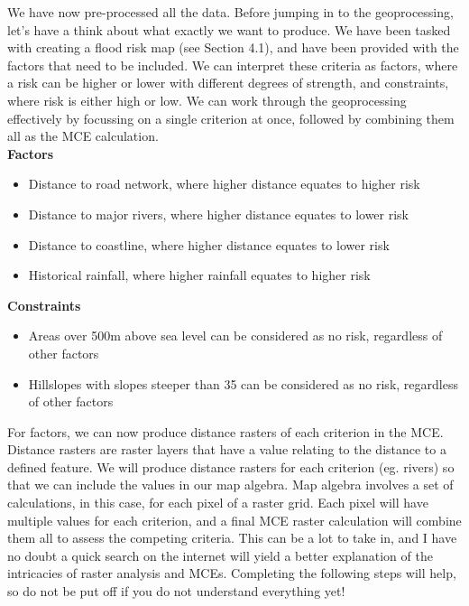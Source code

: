 \documentclass{article}
\begin{document}
We have now pre-processed all the data. Before jumping in to the geoprocessing, let's have a think about what exactly we want to produce. We have been tasked with creating a flood risk map (see Section 4.1), and have been provided with the factors that need to be included. We can interpret these criteria as factors, where a risk can be higher or lower with different degrees of strength, and constraints, where risk is either high or low. We can work through the geoprocessing effectively by focussing on a single criterion at once, followed by combining them all as the MCE calculation. \\

\textbf{Factors}
\begin{itemize}
  \item Distance to road network, where higher distance equates to higher risk
  \item Distance to major rivers, where higher distance equates to lower risk
  \item Distance to coastline, where higher distance equates to lower risk
  \item Historical rainfall, where higher rainfall equates to higher risk
\end{itemize}
\textbf{Constraints}
\begin{itemize}
  \item Areas over 500m above sea level can be considered as no risk, regardless of other factors
  \item Hillslopes with slopes steeper than 35\textdegree{} can be considered as no risk, regardless of other factors \\
\end{itemize}

For factors, we can now produce distance rasters of each criterion in the MCE. Distance rasters are raster layers that have a value relating to the distance to a defined feature. We will produce distance rasters for each criterion (eg. rivers) so that we can include the values in our map algebra. Map algebra involves a set of calculations, in this case, for each pixel of a raster grid. Each pixel will have multiple values for each criterion, and a final MCE raster calculation will combine them all to assess the competing criteria. This can be a lot to take in, and I have no doubt a quick search on the internet will yield a better explanation of the intricacies of raster analysis and MCEs. Completing the following steps will help, so do not be put off if you do not understand everything yet! \\
\end{document}
